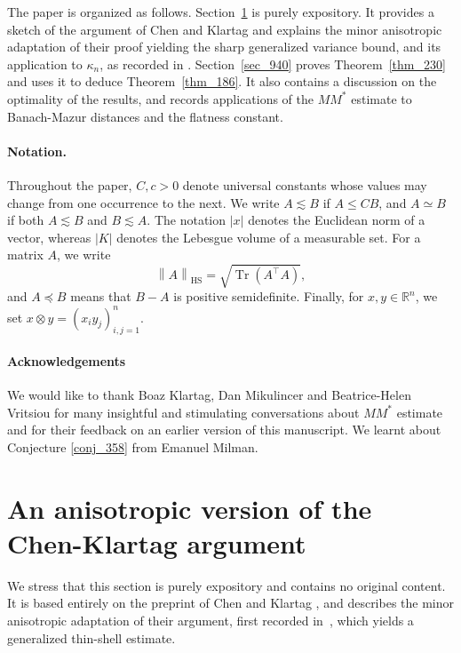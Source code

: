 \documentclass[12pt]{article}
\theoremstyle{definition}
\theoremstyle{remark}
\newcommand{\R}{\mathbb R}
\newcommand{\Tr}{\operatorname{Tr}}
\newcommand{\HS}{\mathrm{HS}}
\newcommand{\norm}[1]{\left\lVert #1\right\rVert}
\begin{document}
\medskip

The paper is organized as follows. Section~\ref{sec_513} is purely
expository. It provides a sketch of the
argument of Chen and Klartag and explains the minor anisotropic adaptation of their proof yielding the sharp generalized variance bound, and its application to $\kappa_n$, as recorded in \cite{Letwin}. Section~\ref{sec_940} proves
Theorem~\ref{thm_230} and uses it to deduce Theorem~\ref{thm_186}. It also contains a discussion on the optimality of the results, and records applications of the $MM^*$
estimate to Banach-Mazur distances and the flatness constant.

\paragraph{Notation.}
Throughout the paper, $C,c>0$ denote universal constants whose values
may change from one occurrence to the next. We write $A\lesssim B$ if
$A\leq CB$, and $A\simeq B$ if both $A\lesssim B$ and $B\lesssim A$.
The notation $|x|$ denotes the Euclidean norm of a vector, whereas
$|K|$ denotes the Lebesgue volume of a measurable set. For a matrix
$A$, we write
\[
  \norm{A}_{\HS}=\sqrt{\Tr(A^\top A)},
\]
and $A\preceq B$ means that $B-A$ is positive semidefinite. Finally,
for $x,y\in\R^n$, we set $x\otimes y=(x_i y_j)_{i,j=1}^n$.

\paragraph{Acknowledgements} We would like to thank Boaz Klartag, Dan Mikulincer and Beatrice-Helen Vritsiou for many insightful and stimulating conversations about $MM^*$ estimate and for their feedback on an earlier version of this manuscript. We learnt about Conjecture \ref{conj_358} from Emanuel Milman.

\section{An anisotropic version of the Chen-Klartag argument}
\label{sec_513}

We stress that this section is purely expository and contains no
original content. It is based entirely on the preprint of Chen and Klartag
\cite{ChenKlartag}, and describes the minor anisotropic adaptation of
their argument, first recorded in~\cite{Letwin}, which yields a
generalized thin-shell estimate.
\end{document}
